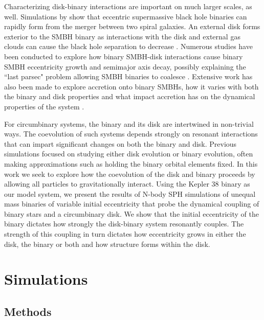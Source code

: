 Characterizing disk-binary interactions are important on much larger scales, as well.  Simulations by \citet{Mayer07} show that eccentric supermassive
black hole binaries can rapidly form from the merger between two spiral galaxies.  An external disk forms exterior to the SMBH binary
as interactions with the disk and external gas clouds can cause the black hole separation to decrease \citep{Roskar15}.  Numerous studies have been 
conducted to explore how binary SMBH-disk interactions cause binary SMBH eccentricity growth and semimajor axis decay, possibly 
explaining the ``last parsec" problem allowing SMBH binaries to coalesce \citep[e.g.][]{Armitage2005,Escala2005,Cuadra2009,Roedig12,Aly15}.  Extensive work
has also been made to explore accretion onto binary SMBHs, how it varies with both the binary and disk properties and what impact accretion
has on the dynamical properties of the system \citep[e.g.][]{Shi12,DOrazio2013,Nixon13,Farris2014}.
 
For circumbinary systems, the binary and its disk are intertwined in
non-trivial ways.  The coevolution of such systems depends strongly on
resonant interactions that can impart significant changes on both the
binary and disk.  Previous simulations focused on studying either disk evolution or binary evolution, often making approximations
such as holding the binary orbital elements fixed.  In this work we seek to explore how the coevolution
of the disk and binary proceeds by allowing all particles to gravitationally interact.  
Using the Kepler 38 binary as our model system, we present the results of N-body
SPH simulations of unequal mass binaries of variable initial eccentricity 
that probe the dynamical coupling of binary stars and a circumbinary disk.  
We show that the initial eccentricity of the binary dictates how strongly the disk-binary system resonantly couples.
The strength of this coupling in turn dictates how eccentricity grows in either the disk, the binary or both and how structure 
forms within the disk.

\section{Simulations}

\subsection{Methods} \label{methods_section}

